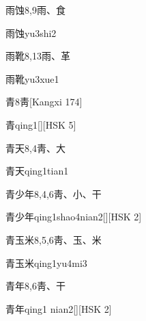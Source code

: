\begin{Entry}{雨蚀}{8,9}{⾬、⾷}
  \begin{Phonetics}{雨蚀}{yu3shi2}
  \end{Phonetics}
\end{Entry}

\begin{Entry}{雨靴}{8,13}{⾬、⾰}
  \begin{Phonetics}{雨靴}{yu3xue1}
  \end{Phonetics}
\end{Entry}

\begin{Entry}{青}{8}{⾭}[Kangxi 174]
  \begin{Phonetics}{青}{qing1}[][HSK 5]
  \end{Phonetics}
\end{Entry}

\begin{Entry}{青天}{8,4}{⾭、⼤}
  \begin{Phonetics}{青天}{qing1tian1}
  \end{Phonetics}
\end{Entry}

\begin{Entry}{青少年}{8,4,6}{⾭、⼩、⼲}
  \begin{Phonetics}{青少年}{qing1shao4nian2}[][HSK 2]
  \end{Phonetics}
\end{Entry}

\begin{Entry}{青玉米}{8,5,6}{⾭、⽟、⽶}
  \begin{Phonetics}{青玉米}{qing1yu4mi3}
  \end{Phonetics}
\end{Entry}

\begin{Entry}{青年}{8,6}{⾭、⼲}
  \begin{Phonetics}{青年}{qing1 nian2}[][HSK 2]
  \end{Phonetics}
\end{Entry}


